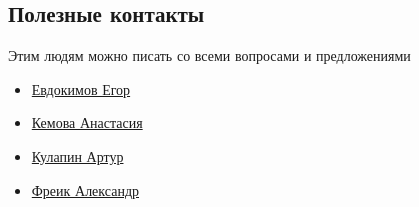 \subsection{Полезные контакты}
Этим людям можно писать со всеми вопросами и предложениями
\begin{multicols}{2}
	\begin{itemize}
		\item \href{https://vk.com/ea_evdokimov}{Евдокимов Егор}
		\item \href{https://vk.com/tasyakemova}{Кемова Анастасия}
		\item \href{https://vk.com/kulart00}{Кулапин Артур}
		\item \href{https://vk.com/akira33333}{Фреик Александр}
	\end{itemize}
\end{multicols}
